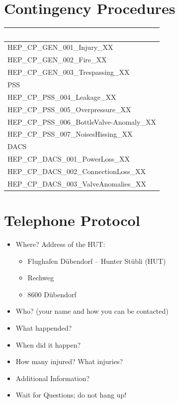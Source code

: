 \documentclass{article}
\begin{document}
\section{Contingency Procedures}
\begin{tabularx}{0.9\textwidth}{|X|}
    \cellcolor{blue} \textcolor{white}{General} \\ \hline
    HEP\_CP\_GEN\_001\_Injury\_XX \\ \hline
    HEP\_CP\_GEN\_002\_Fire\_XX \\ \hline
    HEP\_CP\_GEN\_003\_Trespassing\_XX \\ \hline
    \cellcolor{orange} PSS \\ \hline
    HEP\_CP\_PSS\_004\_Leakage\_XX \\ \hline
    HEP\_CP\_PSS\_005\_Overpressure\_XX \\ \hline
    HEP\_CP\_PSS\_006\_BottleValve-Anomaly\_XX \\ \hline
    HEP\_CP\_PSS\_007\_NoisesHissing\_XX \\ \hline
    \cellcolor{yellow} DACS \\ \hline
    HEP\_CP\_DACS\_001\_PowerLoss\_XX \\ \hline
    HEP\_CP\_DACS\_002\_ConnectionLoss\_XX \\ \hline
    HEP\_CP\_DACS\_003\_ValveAnomalies\_XX \\ \hline
\end{tabularx}
\newpage
\section{Telephone Protocol}
\begin{itemize}
    \item Where? Address of the HUT:
    \begin{itemize}
        \item Flughafen Dübendorf – Hunter Stübli (HUT)
        \item Rechweg
        \item 8600 Dübendorf
    \end{itemize}
    \item Who? (your name and how you can be contacted)
    \item What happended?
    \item When did it happen?
    \item How many injured? What injuries?
    \item Additional Information?
    \item Wait for Questions; do not hang up!
\end{itemize}
\end{document}
